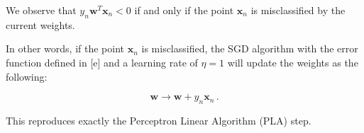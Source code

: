 \documentclass[11pt]{article}
\makeatletter
\newcommand{\boxspacing}{\kern\kvtcb@left@rule\kern\kvtcb@boxsep}
\newcommand{\prompt}[4]{
        \ttfamily\llap{{\color{#2}[#3]:\hspace{3pt}#4}}\vspace{-\baselineskip}
    }
\makeatother
\begin{document}
We observe that \(y_n\mathbf{w}^T\mathbf{x}_n<0\) if and only if the
point \(\mathbf{x}_n\) is misclassified by the current weights.

In other words, if the point \(\mathbf{x}_n\) is misclassified, the SGD
algorithm with the error function defined in {[}e{]} and a learning rate
of \(\eta=1\) will update the weights as the following:

\begin{equation}
\mathbf{w}\rightarrow \mathbf{w}+y_n\mathbf{x}_n\,.
\end{equation}

This reproduces exactly the Perceptron Linear Algorithm (PLA) step.

    \begin{tcolorbox}[breakable, size=fbox, boxrule=1pt, pad at break*=1mm,colback=cellbackground, colframe=cellborder]
\prompt{In}{incolor}{ }{\boxspacing}
\begin{Verbatim}[commandchars=\\\{\}]

\end{Verbatim}
\end{tcolorbox}


    
    
    
\end{document}
